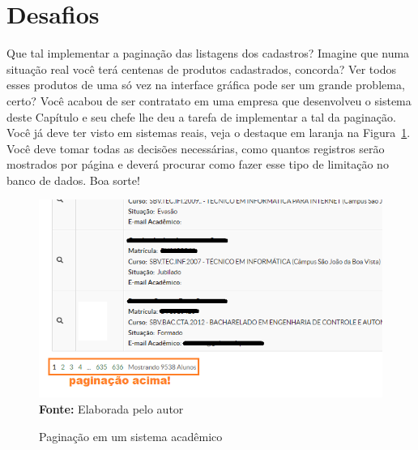 \section{Desafios}

\begin{desafioSemArquivo}{}{}{}
    Que tal implementar a paginação das listagens dos cadastros? Imagine que numa situação real você terá centenas de produtos cadastrados, concorda? Ver todos esses produtos de uma só vez na interface gráfica pode ser um grande problema, certo? Você acabou de ser contratato em uma empresa que desenvolveu o sistema deste Capítulo e seu chefe lhe deu a tarefa de implementar a tal da paginação. Você já deve ter visto em sistemas reais, veja o destaque em laranja na Figura~\ref{fig:cap08DesafioPaginacao}. Você deve tomar todas as decisões necessárias, como quantos registros serão mostrados por página e deverá procurar como fazer esse tipo de limitação no banco de dados. Boa sorte!
    
    \FloatBarrier
    \begin{figure}[!htbp]
        \centering
        \caption{Paginação em um sistema acadêmico}
        \includegraphics[scale=0.8]{imagens/cap08DesafioPaginacao}
        \\\textbf{Fonte:} Elaborada pelo autor
        \label{fig:cap08DesafioPaginacao}
    \end{figure}
    \FloatBarrier
\end{desafioSemArquivo}

